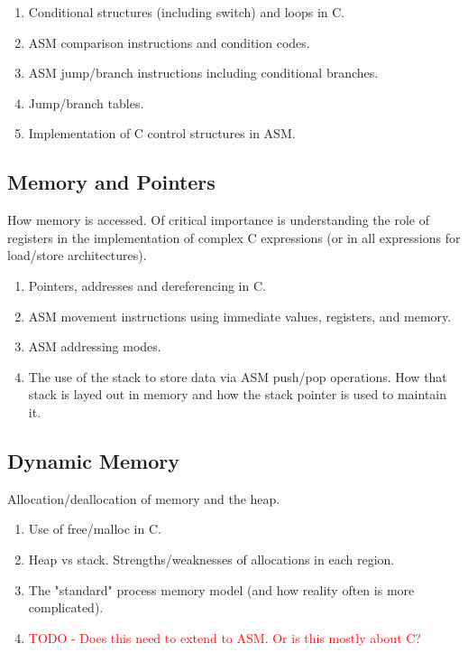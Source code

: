 \documentclass[12pt,letterpaper]{article}
\begin{document}
	\begin{enumerate}
		\item Conditional structures (including switch) and loops in C.
		\item ASM comparison instructions and condition codes.
		\item ASM jump/branch instructions including conditional branches.
		\item Jump/branch tables.
		\item Implementation of C control structures in ASM.
	\end{enumerate}


	\subsection{Memory and Pointers}

	How memory is accessed. Of critical importance is understanding the role of registers in the implementation of complex C expressions (or in all expressions for load/store architectures).

	\begin{enumerate}
		\item Pointers, addresses and dereferencing in C.
		\item ASM movement instructions using immediate values, registers, and memory.
		\item ASM addressing modes.
		\item The use of the stack to store data via ASM push/pop operations. How that stack is layed out in memory and how the stack pointer is used to maintain it.
	\end{enumerate}

	\subsection{Dynamic Memory}

	Allocation/deallocation of memory and the heap.

	\begin{enumerate}
		\item Use of free/malloc in C.
		\item Heap vs stack. Strengths/weaknesses of allocations in each region.
		\item The "standard" process memory model (and how reality often is more complicated).
		\item \textcolor{red}{TODO - Does this need to extend to ASM. Or is this mostly about C?}
	\end{enumerate}
\end{document}
